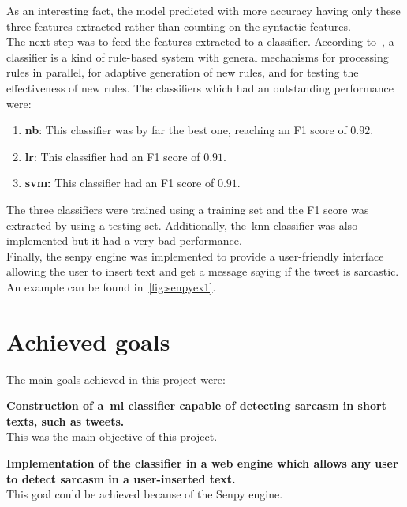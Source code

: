  As an interesting fact, the model predicted with more accuracy having only these three features extracted rather than counting on the syntactic features.\\
The next step was to feed the features extracted to a classifier. According to~\cite{clasif}, a classifier is a kind of rule-based system with general mechanisms for processing rules in parallel, for adaptive generation of new rules, and for testing the effectiveness of new rules. The classifiers which had an outstanding performance were:
\begin{enumerate}
	\item \textbf{\acl{nb}}: This classifier was by far the best one, reaching an F1 score of $0.92$.
	\item \textbf{\acl{lr}}: This classifier had an F1 score of $0.91$.
	\item \textbf{\acl{svm}:} This classifier had an F1 score of $0.91$.
\end{enumerate} 
The three classifiers were trained using a training set and the F1 score was extracted by using a testing set.
Additionally, the~\acl{knn} classifier was also implemented but it had a very bad performance.\\
Finally, the senpy engine was implemented to provide a user-friendly interface allowing the user to insert text and get a message saying if the tweet is sarcastic. An example can be found in~\cref{fig:senpyex1}.
 
\section{Achieved goals}
The main goals achieved in this project were:
\begin{description}
\item \textbf{Construction of a~\ac{ml} classifier capable of detecting sarcasm in short texts, such as tweets.}\\
This was the main objective of this project.
\item \textbf{Implementation of the classifier in a web engine which allows any user to detect sarcasm in a user-inserted text.}\\
This goal could be achieved because of the Senpy engine.

\end{description}

